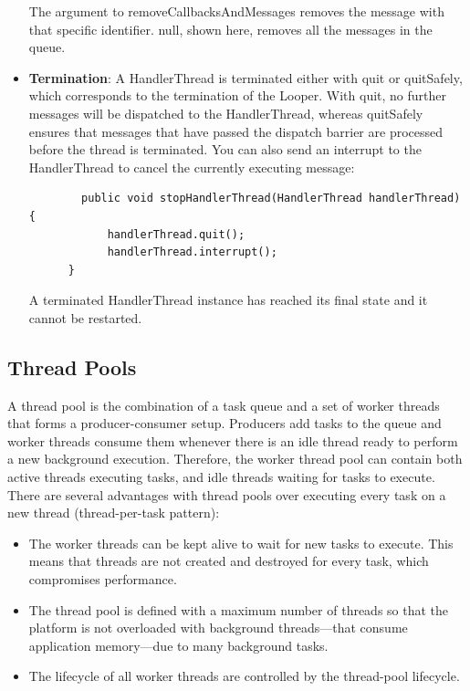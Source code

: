 \begin{itemize}
	The argument to removeCallbacksAndMessages removes the message with that specific identifier. null, shown here, removes all the messages in the queue.
	\item \textbf{Termination}: A HandlerThread is terminated either with quit or quitSafely, which corresponds to the termination of the Looper. With quit, no further messages will be dispatched to the HandlerThread, whereas quitSafely ensures that messages that have passed the dispatch barrier are processed before the thread is terminated. You can also send an interrupt to the HandlerThread to cancel the currently executing message:
	\begin{lstlisting}
		public void stopHandlerThread(HandlerThread handlerThread) {
			handlerThread.quit();
			handlerThread.interrupt();
	  }
	\end{lstlisting}
	A terminated HandlerThread instance has reached its final state and it cannot be restarted.
\end{itemize}

\subsection{Thread Pools}
A thread pool is the combination of a task queue and a set of worker threads that forms a producer-consumer setup. Producers add tasks to the queue and worker threads consume them whenever there is an idle thread ready to perform a new background execution. Therefore, the worker thread pool can contain both active threads executing tasks, and idle threads waiting for tasks to execute.
There are several advantages with thread pools over executing every task on a new thread (thread-per-task pattern):
\begin{itemize}
	\item The worker threads can be kept alive to wait for new tasks to execute. This means that threads are not created and destroyed for every task, which compromises performance.
	\item The thread pool is defined with a maximum number of threads so that the platform is not overloaded with background threads—that consume application memory—due to many background tasks.
	\item The lifecycle of all worker threads are controlled by the thread-pool lifecycle.
\end{itemize}

